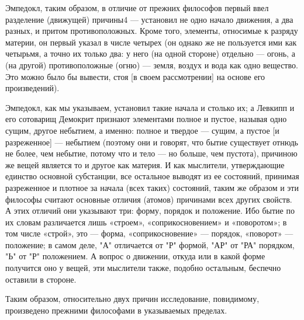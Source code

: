 \documentclass{article}
\begin{document}
Эмпедокл, таким образом, в отличие от прежних философов первый ввел разделение (движущей) причины4  --- установил не одно начало движения, а два разных, и притом противоположных. Кроме того, элементы, относимые к разряду материи, он первый указал в числе четырех (он однако же не пользуется ими как четырьмя, а точно их только два: у него (на одной стороне) отдельно --- огонь, а (на другой) противоположные (огню) --- земля, воздух и вода как одно вещество. Это можно было бы вывести, стоя [в своем рассмотрении] на основе его произведений).

Эмпедокл, как мы указываем, установил такие начала и столько их; а Левкипп и его сотоварищ Демокрит признают элементами полное и пустое, называя одно сущим, другое небытием, а именно: полное и твердое --- сущим, а пустое [и разреженное] --- небытием (поэтому они и говорят, что бытие существует отнюдь не более, чем небытие, потому что и тело --- но больше, чем пустота), причиною же вещей является то и другое как материя. И как мыслители, утверждающие единство основной субстанции, все остальное выводят из ее состояний, принимая разреженное и плотное за начала (всех таких) состояний, таким же образом и эти философы считают основные отличия (атомов) причинами всех других свойств. А этих отличий они указывают три: форму, порядок и положение. Ибо бытие по их словам различается лишь «строем», «соприкосновением» и «поворотом»; в том числе «строй», это --- форма, «соприкосновение» --- порядок, «поворот» --- положение; в самом деле, "А" отличается от "Р" формой, "АР" от "РА" порядком, "Ь" от "Р" положением. А вопрос о движении, откуда или в какой форме получится оно у вещей, эти мыслители также, подобно остальным, беспечно оставили в стороне.

Таким образом, относительно двух причин исследование, повидимому, произведено прежними философами в указываемых пределах.
\end{document}
